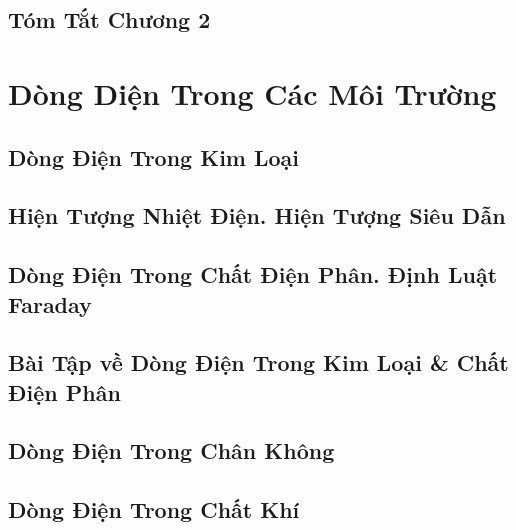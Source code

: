 \documentclass[oneside]{book}
\numberwithin{equation}{section}
\begin{document}

\section{Tóm Tắt Chương 2}


\chapter{Dòng Diện Trong Các Môi Trường}

\section{Dòng Điện Trong Kim Loại}


\section{Hiện Tượng Nhiệt Điện. Hiện Tượng Siêu Dẫn}


\section{Dòng Điện Trong Chất Điện Phân. Định Luật Faraday}


\section{Bài Tập về Dòng Điện Trong Kim Loại \& Chất Điện Phân}


\section{Dòng Điện Trong Chân Không}


\section{Dòng Điện Trong Chất Khí}
\end{document}
